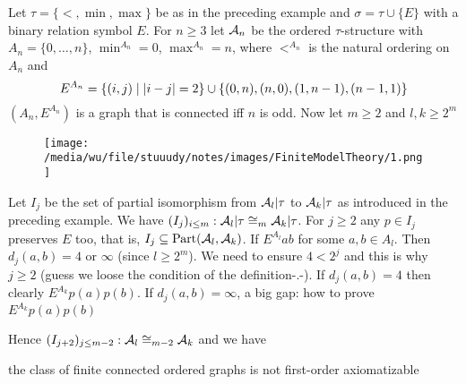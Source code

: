 \documentclass[11pt]{article}
\def \Part {\text{Part}}
\begin{document}
\begin{examplle}[]
Let \(\tau=\{<,\min,\max\}\) be as in the preceding example and \(\sigma=\tau\cup\{E\}\) with a
binary relation symbol \(E\). For \(n\ge3\) let \(\mathcal{A}_n\) be the ordered \(\tau\)-structure
with \(A_n=\{0,\dots,n\}\), \(\min^{A_n}=0\), \(\max^{A_n}=n\), where \(<^{A_n}\) is the natural
ordering on \(A_n\) and
\begin{equation*}
E^{A_n}=\{(i,j)\mid\abs{i-j}=2\}\cup
\{(0,n),(n,0),(1,n-1),(n-1,1)\}
\end{equation*}
\((A_n,E^{A_n})\) is a graph that is connected iff \(n\) is odd. Now let \(m\ge2\) and
\(l,k\ge2^m\)

\begin{figure}[htbp]
\centering
\texttt{[image: /media/wu/file/stuuudy/notes/images/FiniteModelTheory/1.png]}
\end{figure}

Let \(I_j\) be the set of partial isomorphism from \(\mathcal{A}_l|\tau\) to \(\mathcal{A}_k|\tau\) as
introduced in the preceding example. We have \((I_j)_{i\le m}:\mathcal{A}_l|\tau\cong_m\mathcal{A}_k|\tau\).
For \(j\ge2\) any \(p\in I_j\) preserves \(E\) too, that is,
\(I_j\subseteq\Part(\cala_l,\cala_k)\). If \(E^{A_l}ab\) for some \(a,b\in A_l\). Then
\(d_j(a,b)=4\) or \(\infty\) (since \(l\ge2^m\)). We need to ensure \(4<2^j\) and this is
why \(j\ge2\) (guess we loose the condition of the definition-.-). If \(d_j(a,b)=4\) then
clearly \(E^{A_k}p(a)p(b)\). If \(d_j(a,b)=\infty\), a big gap: how to prove \(E^{A_k}p(a)p(b)\) \label{Problem2}


Hence \((I_{j+2})_{j\le m-2}:\mathcal{A}_l\cong_{m-2}\mathcal{A}_k\)
and we have

the class of finite connected ordered graphs is not first-order axiomatizable
\end{examplle}
\end{document}
